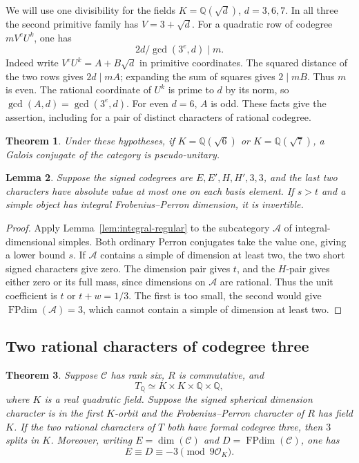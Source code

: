 \documentclass[11pt,reqno]{amsart}
\newtheorem{theorem}{Theorem}[section]
\newtheorem{lemma}[theorem]{Lemma}
\theoremstyle{remark}\newtheorem{remark}[theorem]{Remark}
\numberwithin{equation}{section}
\begin{document}
We will use one divisibility for the fields $K=\mathbb Q(\sqrt d)$,
$d=3,6,7$. In all three the second primitive family has $V=3+\sqrt d$.
For a quadratic row of codegree $mV^eU^k$, one has
\begin{equation}\label{eq:three-quadratic-scalars}
              2d/\gcd(3^e,d)\mid m .
\end{equation}
Indeed write $V^eU^k=A+B\sqrt d$ in primitive coordinates.
The squared distance of the two rows gives $2d\mid mA$;
expanding the sum of squares gives $2\mid mB$. Thus $m$ is even.
The rational coordinate of $U^k$ is prime to $d$ by its norm,
so $\gcd(A,d)=\gcd(3^e,d)$. For even $d=6$, $A$ is odd.
These facts give the assertion, including for a pair of distinct
characters of rational codegree.

\begin{theorem}\label{thm:upstream-24-28}
Under these hypotheses, if $K=\mathbb Q(\sqrt6)$ or
$K=\mathbb Q(\sqrt7)$, a Galois conjugate of the category
is pseudo-unitary.
\end{theorem}

\begin{lemma}\label{lem:integral-three-supported}
Suppose the signed codegrees are $E,E',H,H',3,3$, and the last two
characters have absolute value at most one on each basis element.
If $s>t$ and a simple object has integral Frobenius--Perron dimension,
it is invertible.
\end{lemma}
\begin{proof}
Apply Lemma~\ref{lem:integral-regular} to the subcategory
$\mathcal A$ of integral-dimensional simples.
Both ordinary Perron conjugates take the value one, giving a lower
bound $s$. If $\mathcal A$ contains a simple of dimension at least two,
the two short signed characters give zero. The dimension pair gives
$t$, and the $H$-pair gives either zero or its full mass, since dimensions
on $\mathcal A$ are rational. Thus the unit coefficient is $t$ or
$t+w=1/3$. The first is too small, the second would give
$\operatorname{FPdim}(\mathcal A)=3$, which cannot contain a simple
of dimension at least two.
\end{proof}

\subsection{Two rational characters of codegree three}
\label{sec:two-threes}

\begin{theorem}\label{thm:two-threes-exclusion}
Suppose $\mathcal C$ has rank six, $R$ is commutative, and
\[
 T_{\mathbb Q}\simeq K\times K\times\mathbb Q\times\mathbb Q,
\]
where $K$ is a real quadratic field.
Suppose the signed spherical dimension character is in the first
$K$-orbit and the Frobenius--Perron character of $R$ has field $K$.
If the two rational characters of $T$ both have formal codegree three, then $3$ splits in $K$. Moreover, writing $E=\dim(\mathcal C)$ and $D=\operatorname{FPdim}(\mathcal C)$, one has
\[
 E\equiv D\equiv-3\pmod{9\mathcal O_K}.
\]
\end{theorem}
\end{document}

